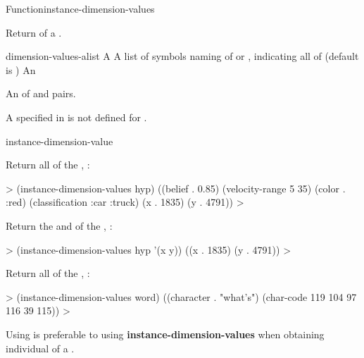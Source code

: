 \documentclass[10pt,twoside,english,pdftex]{article}
\begin{document}
\begin{functiondoc}{Function}{instance-dimension-values}%
  {
     
    \returns{} }
%
%

\fnsyntax

\fnpurpose Return  of a .

\fnpackage {}

\fnmodule {}

\fnargs
\begin{args}{dimension-values-alist}
 A 
 A list of symbols naming  of
   or , indicating all  of 
   (default is )
 An 
\end{args}

\fnreturns An  of  and
 pairs.

\fnerrors A  specified in  is not
defined for .

\begin{alsos}{instance-dimension-value}
\end{alsos}

\fnexamples
%
Return all  of the , :
%
\W\supp
\begin{example}
  > (instance-dimension-values hyp)
  ((belief . 0.85) (velocity-range 5 35) (color . :red)
   (classification :car :truck) (x . 1835) (y . 4791))
  >
\end{example}
%
Return the  and   of the
, :
%
\W\supp\notpretop
\begin{example}
  > (instance-dimension-values hyp '(x y))
  ((x . 1835) (y . 4791))
  >
\end{example}

Return all  of the , :
%
\W\supp
\begin{example}
  > (instance-dimension-values word)
  ((character . "what's") (char-code 119 104 97 116 39 115))
  >
\end{example}

\fnnote Using \textbf{} is preferable to
using \textbf{instance-dimension-values} when obtaining individual
 of a .

\end{functiondoc}
\end{document}
